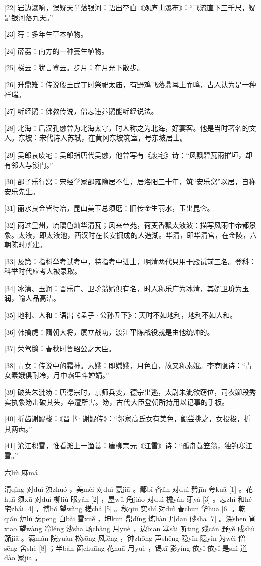 \documentclass[12pt,UTF8]{ctexbook}
\begin{document}
[22] 岩边瀑响，误疑天半落银河：语出李白《观庐山瀑布》：“飞流直下三千尺，疑是银河落九天。”

[23] 荇：多年生草本植物。

[24] 薜荔：南方的一种蔓生植物。

[25] 梯云：犹言登云。步月：在月光下散步。

[26] 升鼎雉：传说殷王武丁时祭祀太庙，有野鸡飞落鼎耳上而鸣，古人认为是一种祥瑞。

[27] 听经鹅：佛教传说，僧志违养鹅能听经说法。

[28] 北海：后汉孔融曾为北海太守，时人称之为北海，好宴客。他是当时著名的文人。东坡：宋代诗人苏轼，在黄冈东坡筑室，号东坡居士。

[29] 吴郎哀废宅：吴郎指唐代吴融，他曾写有《废宅》诗：“风飘碧瓦雨摧垣，却有邻人与锁门。”

[30] 邵子乐行窝：宋经学家邵雍隐居不仕，居洛阳三十年，筑“安乐窝”以居，自称安乐先生。

[31] 丽水良金皆待冶，昆山美玉总须磨：旧传金生丽水，玉出昆仑。

[32] 雨过皇州，琉璃色灿华清瓦；风来帝苑，荷芰香飘太液波：描写风雨中帝都景象。太液，即太液池，西汉时在长安掘成的人造湖。华清，即华清宫，在金陵，六朝陈时所建。

[33] 及第：指科举考试考中，特指考中进士，明清两代只用于殿试前三名。登科：科举时代应考人被录取。

[34] 冰清、玉润：晋乐广、卫玠翁婿俱有名，时人称乐广为冰清，其婿卫玠为玉润，喻人品高洁。

[35] 地利、人和：语出《孟子·公孙丑下》：天时不如地利，地利不如人和。

[36] 韩擒虎：隋朝大将，屡立战功，渡江平陈战役就是由他统帅的。

[37] 荣驾鹅：春秋时鲁昭公之大臣。

[38] 青女：传说中的霜神。素娥：即嫦娥，月色白，故又称素娥。李商隐诗：“青女素娥俱耐冷，月中霜里斗婵娟。”

[39] 破头朱泚笏：唐德宗时，京师兵变，德宗出逃，太尉朱泚欲窃位，司农卿段秀实执象笏击破其头，卒遭所害。笏，古代大臣登朝所持用以记事的手板。

[40] 折齿谢鲲梭：《晋书·谢鲲传》：“邻家高氏女有美色，鲲尝挑之，女投梭，折其两齿。”

[41] 沧江积雪，惟看滩上一渔蓑：唐柳宗元《江雪》诗：“孤舟蓑笠翁，独钓寒江雪。”





六liù 麻má


清qīng 对duì 浊zhuó ，美měi 对duì 嘉jiā 。鄙bǐ 吝lìn 对duì 矜jīn 夸kuā [1] 。花huā 须xū 对duì 柳liǔ 眼yǎn [2] ，屋wū 角jiǎo 对duì 檐yán 牙yá [3] 。志zhì 和hé 宅zhái [4] ，博bó 望wàng 槎chá [5] 。秋qiū 实shí 对duì 春chūn 华huā [6] 。乾qián 炉lú 烹pēng 白bái 雪xuě ，坤kūn 鼎dǐng 炼liàn 丹dān 砂shā [7] 。深shēn 宵xiāo 望wàng 冷lěng 沙shā 场chǎng 月yuè ，边biān 塞sài 听tīng 残cán 野yě 戍shù 笳jiā 。满mǎn 院yuàn 松sōng 风fēng ，钟zhōng 声shēng 隐yǐn 隐yǐn 为wéi 僧sēng 舍shè [8] ；半bàn 窗chuāng 花huā 月yuè ，锡xī 影yǐng 依yī 依yī 是shì 道dào 家jiā 。
\end{document}
